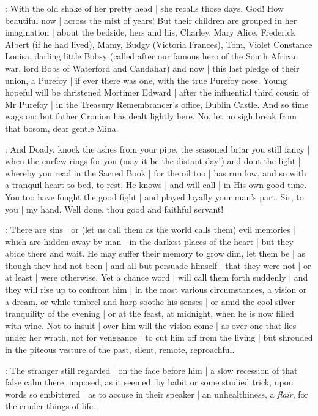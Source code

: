 :
With the old shake of her pretty head |
she recalls those days.
God!
How beautiful now |
across the mist of years!
But their children are grouped in her imagination |
about the bedside,
hers and his,
Charley,
Mary
Alice,
Frederick Albert (if he had lived),
Mamy,
Budgy (Victoria Frances),
Tom,
Violet Constance Louisa,
darling little Bobsy
(called after our famous hero of the South African war,
lord Bobs of Waterford and Candahar)
and now |
this last pledge of their union,
a Purefoy |
if ever there was one,
with the true Purefoy nose.
Young hopeful will be christened Mortimer Edward |
after the influential third cousin of Mr Purefoy |
in the Treasury Remembrancer's office,
Dublin Castle.
And so time wags on:
but father Cronion has dealt lightly here.
No,
let no sigh break from that bosom,
dear gentle Mina.

:
And Doady,
knock the ashes from your pipe,
the seasoned briar you still fancy |
when the curfew rings for you
(may it be the distant day!)
and dout the light |
whereby you read in the Sacred Book |
for the oil too |
has run low,
and so with a tranquil heart to bed,
to rest.
He knows |
and will call |
in His own good time.
You too have fought the good fight |
and played loyally your man's part.
Sir,
to you |
my hand.
Well done,
thou good and faithful servant!


:
There are sins |
or
(let us call them as the world calls them)
evil memories |
which are hidden away by man |
in the darkest places of the heart |
but they abide there and wait.
He may suffer their memory to grow dim,
let them be |
as though they had not been |
and all but persuade himself |
that they were not |
or at least |
were otherwise.
Yet a chance word |
will call them forth suddenly |
and they will rise up to confront him |
in the most various circumstances,
a vision or a dream,
or while timbrel and harp soothe his senses |
or amid the cool silver tranquility of the evening |
or at the feast,
at midnight,
when he is now filled with wine.
Not to insult |
over him will the vision come |
as over one that lies under her wrath,
not for vengeance |
to cut him off from the living |
but shrouded in the piteous vesture of the past,
silent,
remote,
reproachful.


:
The stranger still regarded |
on the face before him |
a slow recession of that false calm there,
imposed,
as it seemed,
by habit or some studied trick,
upon words so embittered |
as to accuse in their speaker |
an unhealthiness,
a \emph{flair},
for the cruder things of life.

